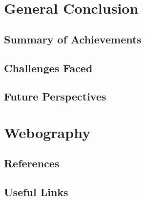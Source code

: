 \documentclass[a4paper,12pt]{report}
\begin{document}
\chapter{General Conclusion}

\section{Summary of Achievements}
\section{Challenges Faced}
\section{Future Perspectives}

\chapter{Webography}

\section{References}
\section{Useful Links}
\end{document}
